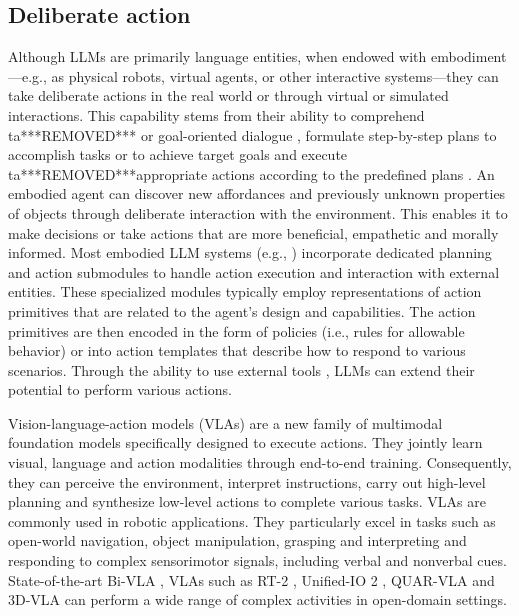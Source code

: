 \documentclass[10pt,journal,compsoc]{IEEEtran}
\begin{document}
	
	
	\subsection{Deliberate action}
	Although LLMs are primarily language entities, when endowed with embodiment—e.g., as physical robots, virtual agents, or other interactive systems—they can take deliberate actions in the real world or through virtual or simulated interactions. This capability stems from their ability to comprehend ta***REMOVED*** or goal-oriented dialogue \cite{mu2024embodiedgpt,wang2024safe,wu2023autogen,liu2022instruction}, formulate step-by-step plans to accomplish tasks or to achieve target goals \cite{xie2023translating,liu2023llm+,valmeekam2023planning} and execute ta***REMOVED***appropriate actions according to the predefined plans \cite{graule2024gg}. An embodied agent can discover new affordances and previously unknown properties of objects through deliberate interaction with the environment. This enables it to make decisions or take actions that are more beneficial, empathetic and morally informed.
	Most embodied LLM systems (e.g., \cite{liu2023llm+,silver2024generalized,silver2022pddl}) incorporate dedicated planning and action submodules to handle action execution and interaction with external entities. These specialized modules typically employ representations of action primitives that are related to the agent’s design and capabilities. The action primitives are then encoded in the form of policies (i.e., rules for allowable behavior) \cite{zhai2024fine,raman2022planning,shi2024large} or into action templates \cite{guan2023leveraging,mahdavi2024leveraging} that describe how to respond to various scenarios. Through the ability to use external tools \cite{paranjape2023art}, LLMs can extend their potential to perform various actions.
	 
	Vision-language-action models (VLAs) \cite{gbagbe2024bi,zhen20243d,jang2022bc,lu2024unified,ding2025quar} are a new family of multimodal foundation models specifically designed to execute actions. They jointly learn visual, language and action modalities through end-to-end training. Consequently, they can perceive the environment, interpret instructions, carry out high-level planning and synthesize low-level actions to complete various tasks. VLAs are commonly used in robotic applications. They particularly excel in tasks such as open-world navigation, object manipulation, grasping and interpreting and responding to complex sensorimotor signals, including verbal and nonverbal cues. State-of-the-art Bi-VLA \cite{gbagbe2024bi}, VLAs such as RT-2 \cite{zitkovich2023rt}, Unified-IO 2 \cite{lu2024unified}, QUAR-VLA \cite{ding2025quar} and 3D-VLA \cite{zhen20243d} can perform a wide range of complex activities in open-domain settings.
	
\end{document}
